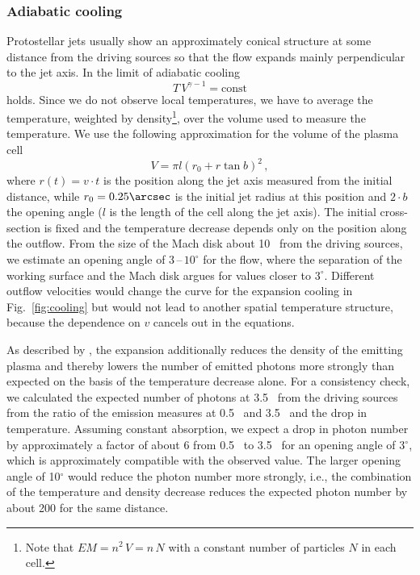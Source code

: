 \subsubsection{Adiabatic cooling\label{sect:aCooling}}
Protostellar jets usually show an approximately conical structure at some distance from the driving sources so that the flow expands mainly perpendicular to the jet axis.
In the limit of adiabatic cooling
\begin{equation}
T\,V^{\gamma-1} = \mbox{const}
\end{equation}
holds. Since we do not observe local temperatures, we have to average the temperature, weighted by density\footnote{Note that $EM=n^2\,V=n\,N$ with a constant number of particles $N$ in each cell.}, over the volume used to measure the temperature. We use the following approximation for the volume of the plasma cell
\begin{equation}
V=\pi l\left(r_0+r\tan b \right)^2\,,
\end{equation}
where $r(t)=v\cdot t$ is the position along the jet axis measured from the initial distance, while $r_0=0.25\arcsec$ is the initial jet radius at this position and $2\cdot b$ the opening angle ($l$ is the length of the cell along the jet axis).
The initial cross-section is fixed and the temperature decrease depends only on the position along the outflow. 
From the size of the Mach disk about 10\arcsec~ from the driving sources, we estimate an opening angle of $3$\,--\,$10^\circ$ for the flow, where the separation of the working surface and the Mach disk argues for values closer to $3^\circ$.
Different outflow velocities would change the curve for the expansion cooling in Fig.~\ref{fig:cooling} but would not lead to another spatial temperature structure, because the dependence on $v$ cancels out in the equations.

As described by \citet{Guedel_2008}, the expansion additionally reduces the density of the emitting plasma and thereby lowers the number of emitted photons more strongly than expected on the basis of the temperature decrease alone. For a consistency check, we calculated the expected number of photons at 3.5\arcsec~ from the driving sources from the ratio of the emission measures at 0.5\arcsec~ and 3.5\arcsec~ and the drop in temperature. Assuming constant absorption, we expect a drop in photon number by approximately a factor of about 6 from 0.5\arcsec~ to 3.5\arcsec~ for an opening angle of 3$^\circ$, which is approximately compatible with the observed value. The larger opening angle of 10$^\circ$ would reduce the photon number more strongly, i.e., the combination of the temperature and  density decrease reduces the expected photon number by about 200 for the same distance. 


